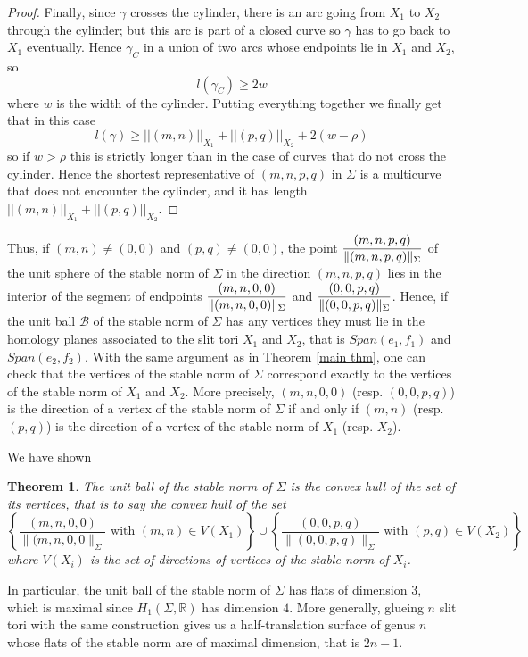 \documentclass{article}
\newcommand{\RR}{\mathbb{R}}
\newcommand{\Bb}{\mathcal{B}}
\newcommand{\StS}[1]{\|#1\|_\Sigma}
\newtheorem{thm}{Theorem}[section]
\theoremstyle{definition}
\begin{document}
\begin{proof}
Finally, since $\gamma$ crosses the cylinder, there is an arc going from $X_1$ to $X_2$ through the cylinder; but this arc is part of a closed curve so $\gamma$ has to go back to $X_1$ eventually. Hence $\gamma_C$ in a union of two arcs whose endpoints lie in $X_1$ and $X_2$, so $$l(\gamma_C) \ge 2w$$ where $w$ is the width of the cylinder.
Putting everything together we finally get that in this case
$$l(\gamma) \ge ||(m,n)||_{X_1} + ||(p,q)||_{X_2} + 2(w - \rho) $$
so if $w>\rho$ this is strictly longer than in the case of curves that do not cross the cylinder. Hence the shortest representative of $(m,n,p,q)$ in $\Sigma$ is a multicurve that does not encounter the cylinder, and it has length $||(m,n)||_{X_1} + ||(p,q)||_{X_2}$. 



\end{proof}

Thus, if $(m,n)\ne (0,0)$ and $(p,q)\ne (0,0)$, the point $\mathlarger{\frac{(m,n,p,q)}{\StS{(m,n,p,q)}}}$ of the unit sphere of the stable norm of $\Sigma$ in the direction $(m,n,p,q)$ lies in the interior of the segment of endpoints $\mathlarger{\frac{(m,n,0,0)}{\StS{(m,n,0,0)}}}$ and $\mathlarger{\frac{(0,0,p,q)}{\StS{(0,0,p,q)}}}$. Hence, if the unit ball $\Bb$ of the stable norm of $\Sigma$ has any vertices they must lie in the homology planes associated to the slit tori $X_1$ and $X_2$, that is $Span(e_1,f_1)$ and $Span(e_2,f_2)$. With the same argument as in Theorem \ref{main thm}, one can check that the vertices of the stable norm of $\Sigma$ correspond exactly to the vertices of the stable norm of $X_1$ and $X_2$. More precisely, $(m,n,0,0)$ (resp. $(0,0,p,q)$) is the direction of a vertex of the stable norm of $\Sigma$ if and only if $(m,n)$ (resp. $(p,q)$) is the direction of a vertex of the stable norm of $X_1$ (resp. $X_2$).



We have shown

\begin{thm}\label{glue}
    The unit ball of the stable norm of $\Sigma$ is the convex hull of the set of its vertices, that is to say the convex hull of the set
    $$ \left \{ \frac{(m,n,0,0)}{\StS{(m,n,0,0}} \text{ with } (m,n)\in V(X_1)  \right \} \cup \left\{\frac{(0,0,p,q)}{\StS{(0,0,p,q)}} \text{ with } (p,q)\in V(X_2)\right\} $$ where $V(X_i)$ is the set of directions of vertices of the stable norm of $X_i$.
\end{thm}

In particular, the unit ball of the stable norm of $\Sigma$ has flats of dimension $3$, which is maximal since $H_1(\Sigma,\RR)$ has dimension $4$. More generally, glueing $n$ slit tori with the same construction gives us a half-translation surface of genus $n$ whose flats of the stable norm are of maximal dimension, that is $2n-1$. \newline
\end{document}
